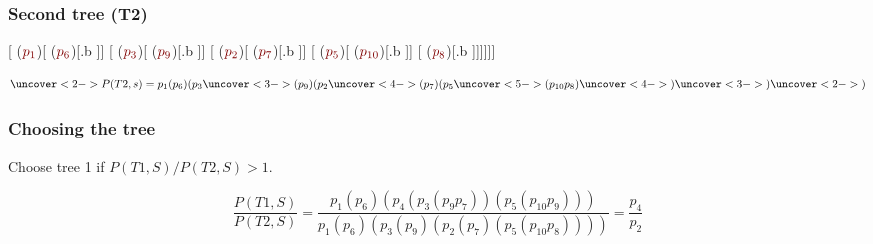 \begin{frame}
  \frametitle{Second tree (T2)}
  \begin{center}
    [ ($\prob{1}$)[ ($\prob{6}$)[.b ]]
                   [ ($\prob{3}$)[ ($\prob{9}$)[.b ]]
                       [\alt<3,4>{\alert{NP}}{NP} ($\prob{2}$)[ ($\prob{7}$)[.b ]]
                           [ ($\prob{5}$)[ ($\prob{10}$)[.b ]]
                               [ ($\prob{8}$)[.b ]]]]]]
   \end{center}
  \[  \uncover<2->{ P(T2, s) = p_1 (p_6) (p_3 }
      \uncover<3->{ (p_9) (p_2 }
      \uncover<4->{ (p_7) (p_5 }
      \uncover<5->{(p_{10} p_8) }
      \uncover<4->{ ) }
      \uncover<3->{ ) }     
      \uncover<2->{ ) }
  \]
\end{frame}

\begin{frame}
  \frametitle{Choosing the tree}
  Choose tree 1 if $P(T1, S)/P(T2, S) > 1$.
  
  \[
    \frac{P(T1, S)}{P(T2, S)} =
    \frac{p_1 (p_6)( p_4 (p_3 (p_9 p_7)) (p_5 (p_{10} p_9)))}
    { p_1 (p_6) (p_3 (p_9) (p_2 (p_7) (p_5 (p_{10} p_8))))} 
    = \frac{p_4}{p_2}
  \]

\end{frame}


